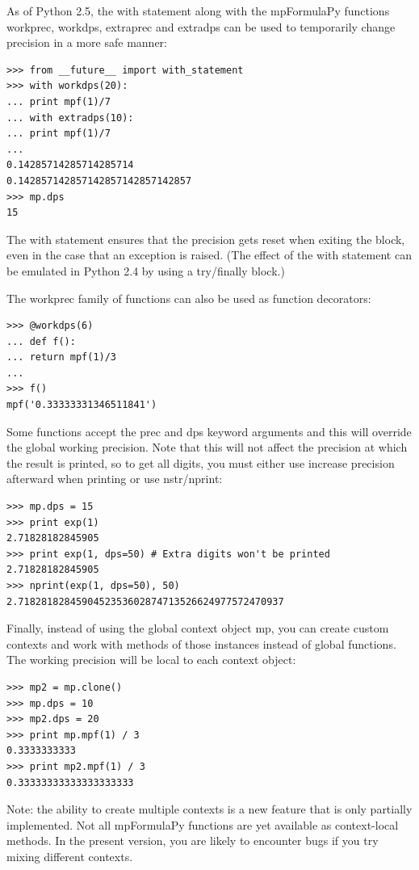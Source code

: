As of Python 2.5, the with statement along with the mpFormulaPy functions workprec, workdps, extraprec and extradps can be used to temporarily change precision in a more safe manner:

\begin{lstlisting}
>>> from __future__ import with_statement
>>> with workdps(20):
... print mpf(1)/7
... with extradps(10):
... print mpf(1)/7
...
0.14285714285714285714
0.142857142857142857142857142857
>>> mp.dps
15
\end{lstlisting}


The with statement ensures that the precision gets reset when exiting the block, even in the case that an exception is raised. (The effect of the with statement can be emulated in Python 2.4 by using a try/finally block.)

The workprec family of functions can also be used as function decorators:

\begin{lstlisting}
>>> @workdps(6)
... def f():
... return mpf(1)/3
...
>>> f()
mpf('0.33333331346511841')
\end{lstlisting}


Some functions accept the prec and dps keyword arguments and this will override the global working precision. Note that this will not affect the precision at which the result is printed, so to get all digits, you must either use increase precision afterward when printing or use nstr/nprint:

\begin{lstlisting}
>>> mp.dps = 15
>>> print exp(1)
2.71828182845905
>>> print exp(1, dps=50) # Extra digits won't be printed
2.71828182845905
>>> nprint(exp(1, dps=50), 50)
2.7182818284590452353602874713526624977572470937
\end{lstlisting}


Finally, instead of using the global context object mp, you can create custom contexts and work with methods of those instances instead of global functions. The working precision will be local to each context object:

\begin{lstlisting}
>>> mp2 = mp.clone()
>>> mp.dps = 10
>>> mp2.dps = 20
>>> print mp.mpf(1) / 3
0.3333333333
>>> print mp2.mpf(1) / 3
0.33333333333333333333
\end{lstlisting}


Note: the ability to create multiple contexts is a new feature that is only partially implemented. Not all mpFormulaPy functions are yet available as context-local methods. In the present version, you are likely to encounter bugs if you try mixing different contexts.


